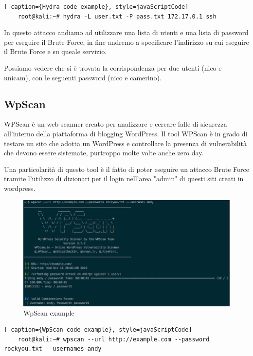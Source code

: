 \begin{lstlisting}[ caption={Hydra code example}, style=javaScriptCode]
    root@kali:~# hydra -L user.txt -P pass.txt 172.17.0.1 ssh
\end{lstlisting}

In questo attacco andiamo ad utilizzare una lista di utenti e una lista di password per eseguire il Brute Force, in fine andremo a specificare l'indirizzo su cui eseguire il Brute Force e su queale servizio.

Possiamo vedere che si è trovata la corrispondenza per due utenti (nico e unicam), con le seguenti password (nico e camerino). 
\newpage

\subsection{WpScan}

WPScan\cite{wpscan} è un web scanner creato per analizzare e cercare falle di sicurezza all’interno della piattaforma di blogging WordPress. Il tool WPScan è in grado di testare un sito che adotta un WordPress e controllare la presenza di vulnerabilità che devono essere sistemate, purtroppo molte volte anche zero day.

Una particolarità di questo tool è il fatto di poter eseguire un attacco Brute Force tramite l'utilizzo di dizionari per il login nell'area "admin" di questi siti creati in wordpress.

\begin{figure}[htpb!]
    \centering
    \includegraphics[width=\linewidth]{Immagini/5/wpscan_example.png}
    \caption{WpScan example\cite{wpscan_example}}
    \label{fig:WpScan example}
\end{figure}

\begin{lstlisting}[ caption={WpScan code example}, style=javaScriptCode]
    root@kali:~# wpscan --url http://example.com --password rockyou.txt --usernames andy
\end{lstlisting}

